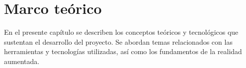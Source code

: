 \chapter{Marco teórico} 
En el presente capítulo se describen los conceptos teóricos y tecnológicos que sustentan el desarrollo del proyecto.
Se abordan temas relacionados con las herramientas y tecnologías utilizadas, así como los fundamentos de la realidad aumentada.
	
	
	